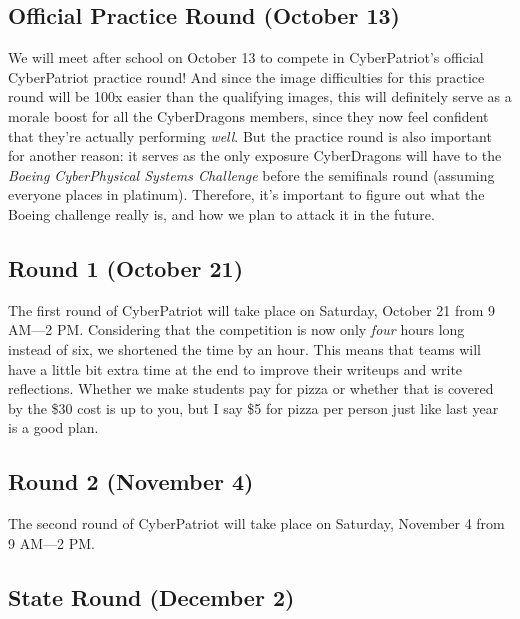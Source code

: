 \documentclass[
  letterpaper,
  DIV=11,
  numbers=noendperiod]{scrartcl}
\begin{document}
\hypertarget{official-practice-round-october-13}{%
\subsection{Official Practice Round (October
13)}\label{official-practice-round-october-13}}

We will meet after school on October 13 to compete in CyberPatriot's
official CyberPatriot practice round! And since the image difficulties
for this practice round will be 100x easier than the qualifying images,
this will definitely serve as a morale boost for all the CyberDragons
members, since they now feel confident that they're actually performing
\emph{well}. But the practice round is also important for another
reason: it serves as the only exposure CyberDragons will have to the
\emph{Boeing CyberPhysical Systems Challenge} before the semifinals
round (assuming everyone places in platinum). Therefore, it's important
to figure out what the Boeing challenge really is, and how we plan to
attack it in the future.

\hypertarget{round-1-october-21}{%
\subsection{Round 1 (October 21)}\label{round-1-october-21}}

The first round of CyberPatriot will take place on Saturday, October 21
from 9 AM---2 PM. Considering that the competition is now only
\emph{four} hours long instead of six, we shortened the time by an hour.
This means that teams will have a little bit extra time at the end to
improve their writeups and write reflections. Whether we make students
pay for pizza or whether that is covered by the \$30 cost is up to you,
but I say \$5 for pizza per person just like last year is a good plan.

\hypertarget{round-2-november-4}{%
\subsection{Round 2 (November 4)}\label{round-2-november-4}}

The second round of CyberPatriot will take place on Saturday, November 4
from 9 AM---2 PM.

\hypertarget{state-round-december-2}{%
\subsection{State Round (December 2)}\label{state-round-december-2}}
\end{document}
